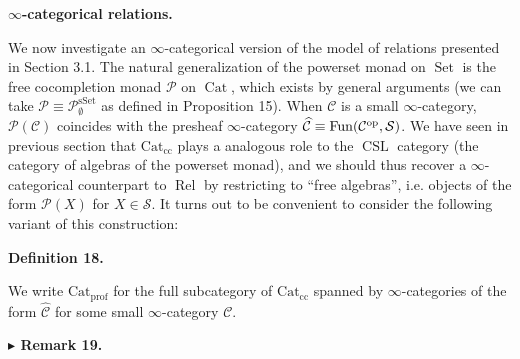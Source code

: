  
 
 
\par\medskip\noindent\textbf{$\infty$-categorical relations.}\par
 
 
We now investigate an $\infty$-categorical version of the model of relations presented in Section 3.1. The natural generalization of the powerset monad on $\operatorname{Set}$ is the free cocompletion monad $\mathcal{P}$ on $\operatorname{Cat}$, which exists by general arguments (we can take $\mathcal{P}\equiv{\mathcal{P}}_{\emptyset}^{\operatorname{sSet}}$ as defined in Proposition 15). When $\mathcal{C}$ is a small $\infty$-category, $\mathcal{P}(\mathcal{C})$ coincides with the presheaf $\infty$-category $\widehat{\mathcal{C}}\equiv\operatorname{Fun}(\mathcal{C}^{\textnormal{op}},\mathcal{S})$. We have seen in previous section that $\operatorname{Cat_{cc}}$ plays a analogous role to the $\operatorname{CSL}$ category (the category of algebras of the powerset monad), and we should thus recover a $\infty$-categorical counterpart to $\operatorname{Rel}$ by restricting to “free algebras”, i.e. objects of the form $\mathcal{P}(X)$ for $X\in\mathcal{S}$. It turns out to be convenient to consider the following variant of this construction:\par
 
 
 
\par\medskip\noindent\textbf{Definition 18.}\par
 
 
We write $\operatorname{Cat_{prof}}$ for the full subcategory of $\operatorname{Cat_{cc}}$ spanned by $\infty$-categories of the form $\widehat{{\mathcal{C}}}$ for some small $\infty$-category ${\mathcal{C}}$.\par
 
 
 
 
\par\medskip\noindent\textbf{$\blacktriangleright$ Remark 19.}\par
 
